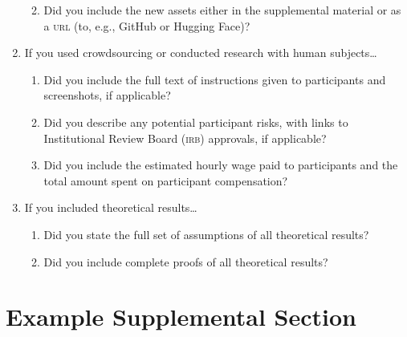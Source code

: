 \documentclass[11pt]{article}
\begin{document}
\begin{enumerate}
\begin{enumerate}
    \answerTODO{}
    \item Did you include the new assets either in the supplemental material or as
    a \textsc{url} (to, e.g., GitHub or Hugging Face)?
    \answerTODO{}
  \end{enumerate}
\item If you used crowdsourcing or conducted research with human subjects\dots
  \begin{enumerate}
  \item Did you include the full text of instructions given to participants and
    screenshots, if applicable?
    \answerTODO{}
  \item Did you describe any potential participant risks, with links to
    Institutional Review Board (\textsc{irb}) approvals, if applicable?
    \answerTODO{}
  \item Did you include the estimated hourly wage paid to participants and the
    total amount spent on participant compensation?
    \answerTODO{}
  \end{enumerate}
\item If you included theoretical results\dots
  \begin{enumerate}
  \item Did you state the full set of assumptions of all theoretical results?
    \answerTODO{}
  \item Did you include complete proofs of all theoretical results?
    \answerTODO{}
  \end{enumerate}
\end{enumerate}

\newpage
\appendix


\section{Example Supplemental Section}
\end{document}
